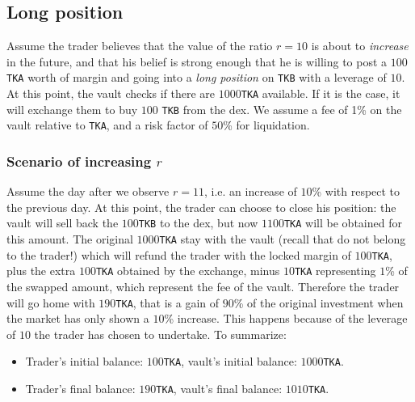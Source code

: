 \documentclass[a4paper,10 pt]{article}
\theoremstyle{definition}
\begin{document}
\subsection{Long position}

Assume the trader believes that the value of the ratio $r = 10$ is about to \emph{increase} in the future, and that his belief is strong enough that he is willing to post a $100$\verb|TKA| worth of margin and going into a \emph{long position} on \verb|TKB| with a leverage of $10$. At this point, the vault checks if there are $1000$\verb|TKA| available. If it is the case, it will exchange them to buy $100$ \verb|TKB| from the dex. We assume a fee of 1\% on the vault relative to \verb|TKA|, and a risk factor of $50$\% for liquidation.

\subsubsection{Scenario of increasing $r$}
Assume the day after we observe $r = 11$, i.e. an increase of $10$\% with respect to the previous day. At this point, the trader can choose to close his position: the vault will sell back the $100$\verb|TKB| to the dex, but now $1100$\verb|TKA| will be obtained for this amount. The original $1000$\verb|TKA| stay with the vault (recall that do not belong to the trader!) which will refund the trader with the locked margin of $100$\verb|TKA|, plus the extra $100$\verb|TKA| obtained by the exchange, minus $10$\verb|TKA| representing $1$\% of the swapped amount, which represent the fee of the vault. Therefore the trader will go home with $190$\verb|TKA|, that is a gain of $90$\% of the original investment when the market has only shown a $10$\% increase. This happens because of the leverage of $10$ the trader has chosen to undertake. To summarize:
\begin{itemize}
    \item Trader's initial balance: $100$\verb|TKA|, vault's initial balance: $1000$\verb|TKA|.
    \item Trader's final balance: $190$\verb|TKA|, vault's final balance: $1010$\verb|TKA|.
\end{itemize}
\end{document}
